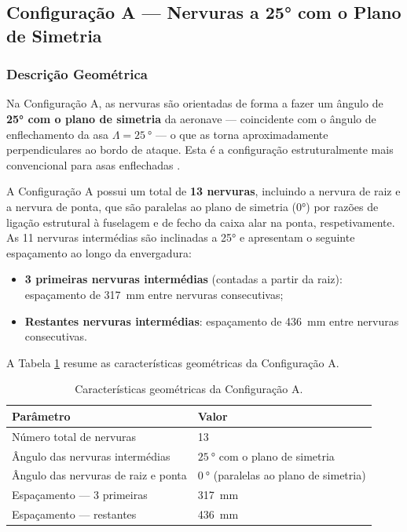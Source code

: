 \documentclass[a4paper,fleqn]{cas-sc}
\begin{document}
\subsection{Configuração A --- Nervuras a 25° com o Plano de Simetria}

\subsubsection{Descrição Geométrica}

Na Configuração A, as nervuras são orientadas de forma a fazer um ângulo de \textbf{25° com o plano de simetria} da aeronave --- coincidente com o ângulo de enflechamento da asa $\Lambda = \qty{25}{\degree}$ --- o que as torna aproximadamente perpendiculares ao bordo de ataque. Esta é a configuração estruturalmente mais convencional para asas enflechadas \cite{Niu1988, Megson2012}.

A Configuração A possui um total de \textbf{13 nervuras}, incluindo a nervura de raiz e a nervura de ponta, que são paralelas ao plano de simetria (0°) por razões de ligação estrutural à fuselagem e de fecho da caixa alar na ponta, respetivamente. As 11 nervuras intermédias são inclinadas a 25° e apresentam o seguinte espaçamento ao longo da envergadura:

\begin{itemize}
    \item \textbf{3 primeiras nervuras intermédias} (contadas 
    a partir da raiz): espaçamento de \SI{317}{\milli\meter} 
    entre nervuras consecutivas;
    \item \textbf{Restantes nervuras intermédias}: espaçamento 
    de \SI{436}{\milli\meter} entre nervuras consecutivas.
\end{itemize}

A Tabela \ref{tab:config_a} resume as características 
geométricas da Configuração A.

\begin{table}
\centering
\caption{Características geométricas da Configuração A.}
\label{tab:config_a}
\renewcommand{\arraystretch}{1.4}
\begin{tabularx}{\textwidth}{p{6cm} X}
\toprule
\textbf{Parâmetro} & \textbf{Valor} \\
\midrule
Número total de nervuras            & 13 \\
Ângulo das nervuras intermédias     & $\qty{25}{\degree}$ com o plano de simetria \\
Ângulo das nervuras de raiz e ponta & $\qty{0}{\degree}$ (paralelas ao plano de simetria) \\
Espaçamento --- 3 primeiras         & \SI{317}{\milli\meter} \\
Espaçamento --- restantes           & \SI{436}{\milli\meter} \\
\bottomrule
\end{tabularx}
\end{table}
\end{document}
